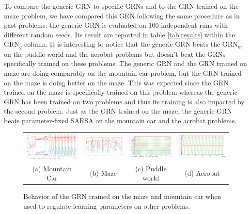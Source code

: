 To compare the generic GRN to specific GRNs and to the GRN trained on the maze problem, we have compared this GRN following the same procedure as in past problems: the generic GRN is evaluated on 100 independent runs with different random seeds. Its result are reported in table \ref{tab:results} within the GRN$_g$ column. It is interesting to notice that the generic GRN beats the GRN$_m$ on the puddle world and the acrobat problems but doesn't beat the GRNs specifically trained on these problems. The generic GRN and the GRN trained on maze are doing comparably on the mountain car problem, but the GRN trained on the maze is doing better on the maze. This was expected since the GRN trained on the maze is specifically trained on this problem whereas the generic GRN has been trained on two problems and thus its training is also impacted by the second problem. Just as the GRN trained on the maze, the generic GRN beats parameter-fixed SARSA on the mountain car and the acrobat problems. 

\begin{figure}[t!]
\center
\setlength{\tabcolsep}{1mm}
\begin{tabular}{cccc}
\includegraphics[width=0.24\linewidth]{MC_GRNGenericBehavior.pdf} &
\includegraphics[width=0.24\linewidth]{MZ_GRNGenericBehavior.pdf} &
\includegraphics[width=0.24\linewidth]{PW_GRNGenericBehavior.pdf} &
\includegraphics[width=0.24\linewidth]{ACP_GRNGenericBehavior.pdf} \\
(a) Mountain Car & (b) Maze & (c) Puddle world & (d) Acrobat
\end{tabular}
\caption{Behavior of the GRN trained on the maze and mountain car when used to regulate learning parameters on other problems.}\label{fig:GRNGenericBehavior}
\end{figure}



